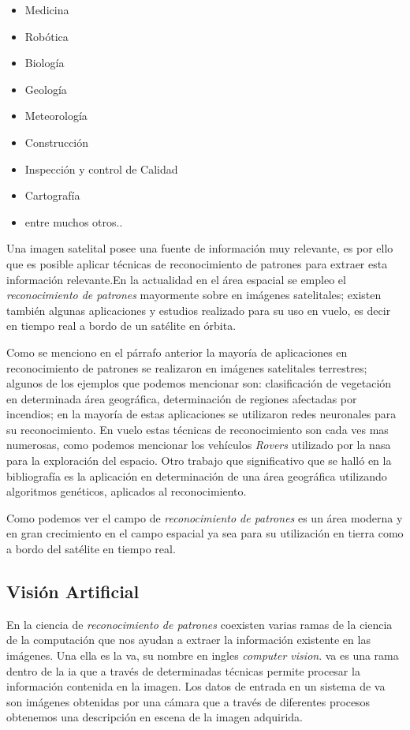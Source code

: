 \begin{itemize}
	\item Medicina
	\item Robótica
	\item Biología
	\item Geología 
	\item Meteorología
	\item Construcción 
	\item Inspección y control de Calidad
	\item Cartografía
	\item entre muchos otros..
\end{itemize}

Una imagen satelital posee una fuente de información muy relevante, es por ello que es posible aplicar técnicas de reconocimiento de patrones para extraer esta información relevante.En la actualidad en el área espacial se empleo el \textit{reconocimiento de patrones} mayormente sobre en imágenes satelitales; existen también algunas aplicaciones y estudios realizado para su uso en vuelo, es decir en tiempo real a bordo de un satélite en órbita. 

Como se menciono en el párrafo anterior la mayoría de aplicaciones en reconocimiento de patrones  se realizaron en imágenes satelitales terrestres; algunos de los ejemplos que podemos mencionar son: clasificación de vegetación en determinada área geográfica, determinación de regiones afectadas por incendios; en la  mayoría de estas aplicaciones se utilizaron redes neuronales 
para su reconocimiento. En vuelo estas técnicas de reconocimiento son cada ves mas numerosas, como podemos mencionar los  vehículos \textit{Rovers} utilizado por la \ac{nasa} para la exploración del espacio. Otro trabajo que significativo que se halló en la bibliografía es la aplicación en determinación de una área geográfica utilizando algoritmos genéticos, aplicados al reconocimiento. 

Como podemos ver el campo de \textit{reconocimiento de patrones} es un área moderna y en gran crecimiento en el campo espacial ya sea para su utilización en tierra como a bordo del satélite en tiempo real.


\subsection{Visión Artificial}\label{sub:introva}
En la ciencia de \textit{reconocimiento de patrones} coexisten varias ramas de la ciencia de la computación que nos ayudan a extraer la información existente en las imágenes. Una  ella es la \ac{va}, su nombre en ingles \textit{computer vision}.  \ac{va} es una rama dentro de la \ac{ia} que a través de determinadas técnicas permite procesar la información contenida en la imagen. Los datos de entrada en un sistema de \ac{va} son imágenes obtenidas por una cámara que a través de diferentes procesos obtenemos una descripción en escena de la imagen adquirida.
 
